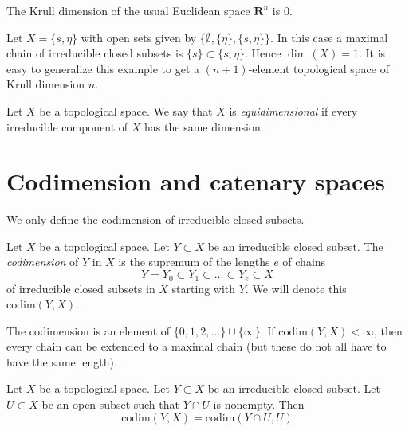 \begin{example}
\label{example-Krull-Rn}
The Krull dimension of the usual Euclidean space
$\mathbf{R}^n$ is $0$.
\end{example}

\begin{example}
\label{example-krull-2set}
Let $X = \{s, \eta\}$ with open sets given
by $\{\emptyset, \{\eta\}, \{s, \eta\}\}$.
In this case a maximal chain of irreducible
closed subsets is $\{s\} \subset \{s, \eta\}$.
Hence $\dim(X) = 1$. It is easy to generalize
this example to get a $(n + 1)$-element topological
space of Krull dimension $n$.
\end{example}

\begin{definition}
\label{definition-equidimensional}
Let $X$ be a topological space.
We say that $X$ is {\it equidimensional} if every irreducible
component of $X$ has the same dimension.
\end{definition}





\section{Codimension and catenary spaces}
\label{section-catenary-spaces}

\noindent
We only define the codimension of irreducible closed subsets.

\begin{definition}
\label{definition-codimension}
Let $X$ be a topological space.
Let $Y \subset X$ be an irreducible closed subset.
The {\it codimension} of $Y$ in $X$ is the supremum of
the lengths $e$ of chains
$$
Y = Y_0 \subset Y_1 \subset \ldots \subset Y_e \subset X
$$
of irreducible closed subsets in $X$ starting with $Y$.
We will denote this $\text{codim}(Y, X)$.
\end{definition}

\noindent
The codimension is an element of $\{0, 1, 2, \ldots\} \cup \{\infty\}$.
If $\text{codim}(Y, X) < \infty$, then every chain can be extended to
a maximal chain (but these do not all have to have the same length).

\begin{lemma}
\label{lemma-codimension-at-generic-point}
Let $X$ be a topological space.
Let $Y \subset X$ be an irreducible closed subset.
Let $U \subset X$ be an open subset such that $Y \cap U$ is nonempty.
Then
$$
\text{codim}(Y, X) = \text{codim}(Y \cap U, U)
$$
\end{lemma}

